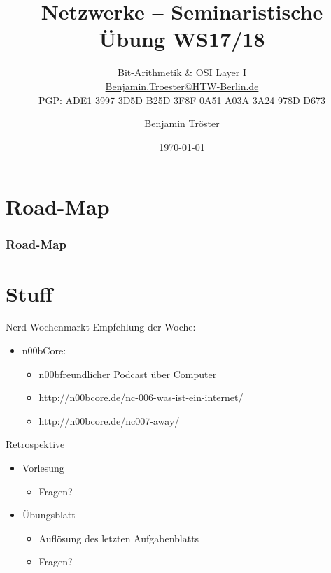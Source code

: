 \documentclass[xcolor=dvipsnames]{beamer}
\begin{document}

\title{Netzwerke -- Seminaristische Übung WS17/18}
\subtitle{Bit-Arithmetik \& OSI Layer I\\
		\href{mailto:Benjamin.Troester@HTW-Berlin.de}{Benjamin.Troester@HTW-Berlin.de}\\
		PGP: ADE1 3997 3D5D B25D 3F8F 0A51 A03A 3A24 978D D673 }
\author{Benjamin Tröster}

\date{\today}

\begin{frame}
\titlepage

\end{frame}

\section*{Road-Map}
\begin{frame}
\frametitle{Road-Map}
\begin{multicols}{2}
  \tableofcontents
\end{multicols}
\end{frame}

\section*{Stuff}
\begin{frame}{Nerd-Wochenmarkt}
Empfehlung der Woche:
\begin{itemize}
	\item n00bCore:
	\begin{itemize}
		\item \glqq n00bfreundlicher Podcast über Computer\grqq
		\item \url{http://n00bcore.de/nc-006-was-ist-ein-internet/}
	 	\item \url{http://n00bcore.de/nc007-away/} 
	\end{itemize}
\end{itemize}
\end{frame}

\begin{frame}{Retrospektive}
\begin{itemize}
	\item Vorlesung
	\begin{itemize}
		\item Fragen?
	\end{itemize}
	\item Übungsblatt
	\begin{itemize}
		\item Auflösung des letzten Aufgabenblatts
		\item Fragen?
	\end{itemize}
\end{itemize}
\end{frame}
\end{document}
